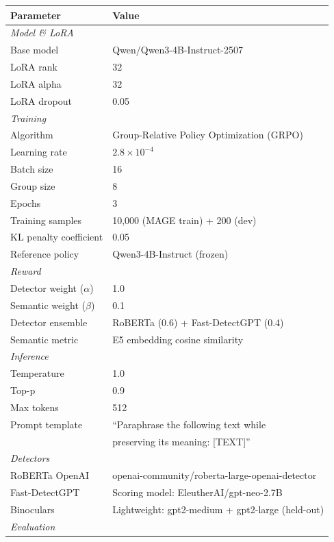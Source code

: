 \documentclass{article} %
\begin{document}
\begin{table}[!ht]
\centering
\small
\begin{tabular}{ll}
\toprule
\textbf{Parameter} & \textbf{Value} \\
\midrule
\multicolumn{2}{l}{\textit{Model \& LoRA}} \\
Base model & Qwen/Qwen3-4B-Instruct-2507 \\
LoRA rank & 32 \\
LoRA alpha & 32 \\
LoRA dropout & 0.05 \\
\midrule
\multicolumn{2}{l}{\textit{Training}} \\
Algorithm & Group-Relative Policy Optimization (GRPO) \\
Learning rate & $2.8 \times 10^{-4}$ \\
Batch size & 16 \\
Group size & 8 \\
Epochs & 3 \\
Training samples & 10,000 (MAGE train) + 200 (dev) \\
KL penalty coefficient & 0.05 \\
Reference policy & Qwen3-4B-Instruct (frozen) \\
\midrule
\multicolumn{2}{l}{\textit{Reward}} \\
Detector weight ($\alpha$) & 1.0 \\
Semantic weight ($\beta$) & 0.1 \\
Detector ensemble & RoBERTa (0.6) + Fast-DetectGPT (0.4) \\
Semantic metric & E5 embedding cosine similarity \\
\midrule
\multicolumn{2}{l}{\textit{Inference}} \\
Temperature & 1.0 \\
Top-p & 0.9 \\
Max tokens & 512 \\
Prompt template & ``Paraphrase the following text while \\
& preserving its meaning: [TEXT]'' \\
\midrule
\multicolumn{2}{l}{\textit{Detectors}} \\
RoBERTa OpenAI & openai-community/roberta-large-openai-detector \\
Fast-DetectGPT & Scoring model: EleutherAI/gpt-neo-2.7B \\
Binoculars & Lightweight: gpt2-medium + gpt2-large (held-out) \\
\midrule
\multicolumn{2}{l}{\textit{Evaluation}} \\

\end{tabular}
\end{table}
\end{document}
